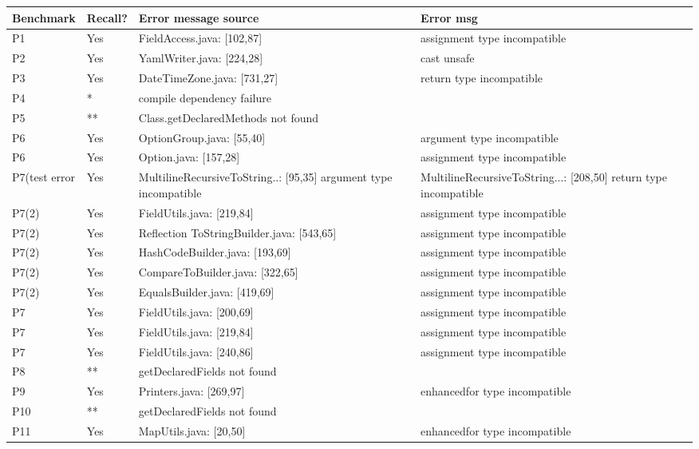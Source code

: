 \begin{table}[]
    \begin{tabular}{|p{1.5cm}|p{1cm}|p{5cm}|p{5cm}|}
        \hline
        Benchmark & Recall? & Error message source & Error msg  \\ \hline
        P1 & Yes & FieldAccess.java: [102,87] & assignment type incompatible \\
        P2 & Yes & YamlWriter.java: [224,28] & cast unsafe  \\
        P3 & Yes & DateTimeZone.java: [731,27] &  return type incompatible \\ 
        P4 & * & compile dependency failure  &   \\ 
        P5 & ** & Class.getDeclaredMethods not found &    \\ 
        P6 & Yes & OptionGroup.java: [55,40]  & argument type incompatible \\ 
        P6 & Yes & Option.java: [157,28]  &  assignment type incompatible\\
        P7(test error & Yes & MultilineRecursiveToString..: [95,35] argument type incompatible & MultilineRecursiveToString...: [208,50]  return type incompatible \\ 
        P7(2) & Yes & FieldUtils.java: [219,84] & assignment type incompatible \\
        P7(2) & Yes & Reflection ToStringBuilder.java: [543,65]  & assignment type incompatible  \\
        P7(2) & Yes & HashCodeBuilder.java: [193,69]  & assignment type incompatible   \\
        P7(2) & Yes & CompareToBuilder.java: [322,65] & assignment type incompatible   \\
        P7(2) & Yes & EqualsBuilder.java: [419,69]  & assignment type incompatible  \\
        P7 & Yes & FieldUtils.java: [200,69] & assignment type incompatible \\
        P7 & Yes & FieldUtils.java: [219,84] & assignment type incompatible  \\
        P7 & Yes & FieldUtils.java: [240,86] & assignment type incompatible  \\
        P8 & ** & getDeclaredFields not found &   \\
        P9 & Yes & Printers.java: [269,97]  &  enhancedfor type incompatible \\
        P10 & ** & getDeclaredFields not found  &  \\
        P11 & Yes & MapUtils.java: [20,50]   & enhancedfor type incompatible  \\

\end{tabular}
\end{table}
